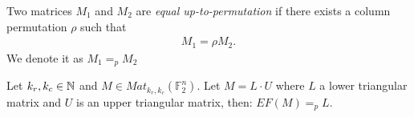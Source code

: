 \documentclass[11pt]{llncs}
\begin{document}
\begin{definition}
   Two matrices $M_1$ and $M_2$ are \textit{equal up-to-permutation} if there exists a column permutation $\rho$ such that
    \begin{align*}
        M_1 = \rho M_2.
    \end{align*}
    We denote it as $M_1 =_p M_2$
\end{definition}

\begin{remark}\label{rem:rowEchelonForm}
    Let $k_r, k_c \in \mathbb{N}$ and $M\in Mat_{k_r,k_c}(\mathbb{F}_2^n)$. Let $M = L\cdot U$ where $L$ a lower triangular matrix and $U$ is an upper triangular matrix, then: $EF(M) =_p L$.
\end{remark}
\end{document}
